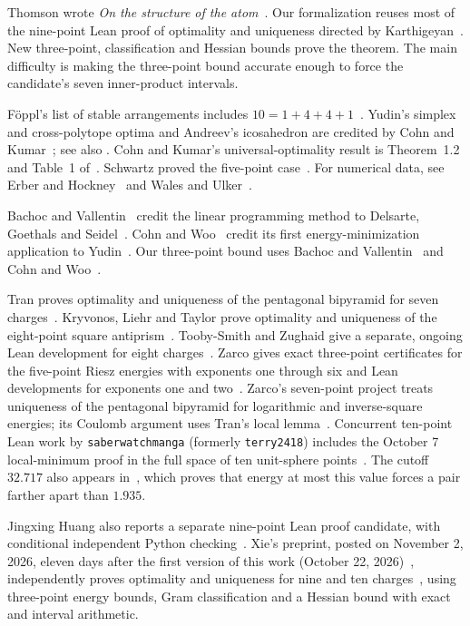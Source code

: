 \documentclass[11pt]{article}
\begin{document}
Thomson wrote \emph{On the structure of the atom}~\cite[p.~237]{thomson}.
Our formalization reuses most of the nine-point Lean proof of optimality
and uniqueness directed by Karthigeyan~\cite{n9}.
New three-point, classification and Hessian bounds prove the theorem.
The main difficulty is making the three-point bound accurate enough to force
the candidate's seven inner-product intervals.

F\"oppl's list of stable arrangements includes
$10=1+4+4+1$~\cite[p.~190]{foppl}.
Yudin's simplex and cross-polytope optima and Andreev's icosahedron
are credited by Cohn and Kumar~\cite[Section~1]{cohnkumar}; see also
\cite{yudin,andreev}. Cohn and Kumar's universal-optimality result is
Theorem~1.2 and Table~1 of~\cite{cohnkumar}.
Schwartz proved the five-point case~\cite[Theorem~1.1]{schwartz}.
For numerical data, see Erber and Hockney~\cite[Fermilab preprint, Table~1]{erber}
and Wales and Ulker~\cite{cambridge}.

Bachoc and Vallentin~\cite[Section~1]{bachoc} credit the linear programming method to
Delsarte, Goethals and Seidel~\cite{delsarte}. Cohn and
Woo~\cite[Section~1.1]{cohnwoo} credit its first energy-minimization application to Yudin~\cite{yudin}.
Our three-point bound uses Bachoc and Vallentin~\cite[Corollary~3.5]{bachoc}
and Cohn and Woo~\cite[Theorem~5]{cohnwoo}.

Tran proves optimality and uniqueness of the pentagonal bipyramid for
seven charges~\cite{n7}. Kryvonos, Liehr and Taylor prove optimality and
uniqueness of the eight-point square antiprism~\cite[Theorem~1.1]{n8}.
Tooby-Smith and Zughaid give a separate, ongoing Lean development
for eight charges~\cite{n8warrant}.
Zarco gives exact three-point certificates for the five-point Riesz
energies with exponents one through six and Lean developments for exponents
one and two~\cite{zarco5}. Zarco's seven-point project treats uniqueness
of the pentagonal bipyramid for logarithmic and inverse-square energies;
its Coulomb argument uses Tran's local lemma~\cite{zarco7}.
Concurrent ten-point Lean work by \texttt{saberwatchmanga} (formerly
\texttt{terry2418}) includes the October 7 local-minimum
proof in the full space of ten unit-sphere points~\cite{concurrent,concurrentlocal}.
The cutoff $32.717$ also appears in~\cite{concurrentchord}, which proves
that energy at most this value forces a pair farther apart than $1.935$.

Jingxing Huang also reports a separate nine-point Lean proof candidate, with
conditional independent Python checking~\cite[README and manuscript abstract]{huangn9}.
Xie's preprint, posted on November 2, 2026, eleven days after the first
version of this work (October 22, 2026)~\cite{v1}, independently proves
optimality and uniqueness for nine and ten charges~\cite[Theorem~1.1]{xie},
using three-point energy bounds, Gram classification and a Hessian bound
with exact and interval arithmetic.
\end{document}
